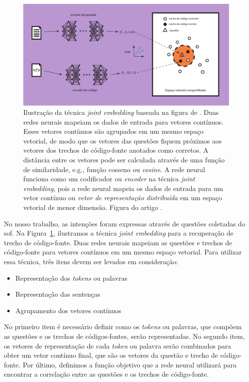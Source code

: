 \begin{figure}[H]
\centering
\includegraphics[width=1\textwidth]{figuras/cap-trabalhos-relacionados/joint_embedding.pdf}
\caption{Ilustração da técnica \textit{joint embedding} baseada na figura de \cite{cambronero-deep-learning-code-search:2019}. Duas redes neurais mapeiam os dados de entrada para vetores contínuos. Esses vetores contínuos são agrupados em um mesmo espaço vetorial, de modo que os vetores das questões fiquem próximos aos vetores dos trechos de código-fonte anotados como corretos. A distância entre os vetores pode ser calculada através de uma função de similaridade, e.g., função cosseno ou \textit{cosine}. A rede neural funciona como um codificador ou \textit{encoder} na técnica \textit{joint embedding}, pois a rede neural mapeia os dados de entrada para um vetor contínuo ou \emph{vetor de representação distribuída} em um espaço vetorial de menor dimensão. Figura do artigo \cite{martins2020concra}.} 
\label{fig:joint-embedding}
\end{figure}

 No nosso trabalho, as intenções foram expressas através de questões coletadas do \Gls{sof}. Na Figura~\ref{fig:joint-embedding}, ilustramos a técnica \textit{joint embedding} para a recuperação de trecho de código-fonte. Duas redes neurais mapeiam as questões e trechos de código-fonte para vetores contínuos em um mesmo espaço vetorial. Para utilizar essa técnica, três itens devem ser levados em consideração:

\begin{itemize}
    \item Representação dos \textit{tokens} ou palavras
    \item Representação das sentenças
    \item Agrupamento dos vetores contínuos 
\end{itemize}


No primeiro item é necessário definir como os \textit{tokens} ou palavras, que compõem as questões e os trechos de códigos-fontes, serão representadas. No segundo item, os vetores de representação de cada \textit{token} ou palavra serão combinados para obter um vetor contínuo final, que são os vetores da questão e trecho de código-fonte. Por último, definimos a função objetivo que a rede neural utilizará para encontrar a correlação entre as questões e os trechos de código-fonte.



